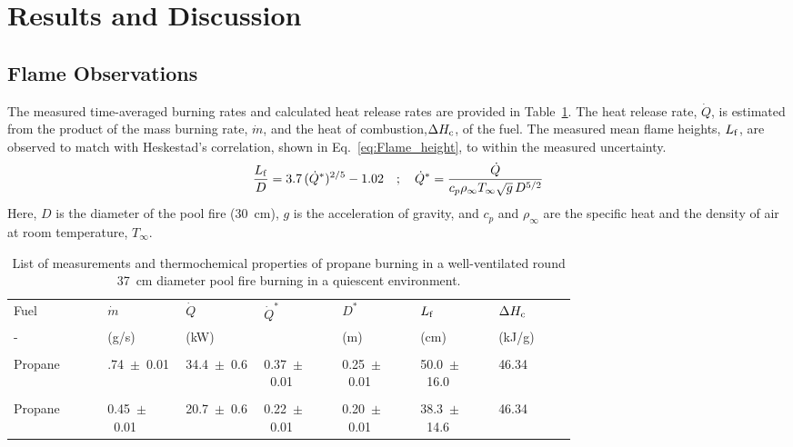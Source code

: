 \documentclass[12pt]{ussci}
\begin{document}
\section{Results and Discussion}
\subsection{Flame Observations}
The measured time-averaged burning rates and calculated heat release rates are provided in Table~\ref{tab:Pool_Fire_Parameters_Table}. The heat release rate, $\dot{Q}$, is estimated from the product of the mass burning rate, $\dot{m}$, and the heat of combustion,$\Delta H_{\rm c}$, of the fuel. The measured mean flame heights, $L_{\rm f}$, are observed to match with Heskestad's correlation, shown in Eq.~\ref{eq:Flame_height}, to within the measured uncertainty.
\begin{equation}\label{eq:Flame_height}
\frac{L_{\rm f}}{D} = 3.7 \, (\dot{Q}^*)^{2/5} - 1.02 \quad ; \quad \dot{Q}^*=\frac{\dot{Q}}{c_{p}\rho_\infty T_\infty \sqrt{g} \, D^{5/2}}
\end{equation}
Here, $D$ is the diameter of the pool fire (30~cm), $g$ is the acceleration of gravity, and $c_p$ and $\rho_\infty$ are the specific heat and the density of air at room temperature, $T_\infty$. 

\begin{table}[!t]
\caption[List of measurements and thermochemical properties of fuels]{List of measurements and thermochemical properties of propane burning in a well-ventilated round 37~cm diameter pool fire burning in a quiescent environment.}
\label{tab:Pool_Fire_Parameters_Table}
\centering
	\footnotesize
	\begin{tabular}{p{0.125\linewidth}p{0.1\linewidth}p{0.1\linewidth}p{0.1\linewidth}p{0.1\linewidth}p{0.1\linewidth}p{0.1\linewidth}}
\hline
{Fuel} &{$\dot{m}$}& { $\dot{Q}$}& {$\dot{Q}^* $}&{$D^*$}&{$L_{\rm f}$}&{$\Delta H_{\rm c}$~\cite{SFPE}}\\
{-} &{(\si{g/{s}})}& {(\si{kW})}& {}&{(\si{m})}&{(\si{cm})}&{(kJ/g)}\\
\hline
\\[0.01cm]
Propane		&	.74~$\pm$~0.01 & 34.4~$\pm$~0.6 & 0.37~$\pm$~0.01 & 0.25~$\pm$~0.01 & 50.0~$\pm$~16.0 & 46.34\\
\\[0.01cm]
Propane		&	0.45~$\pm$~0.01 & 20.7~$\pm$~0.6 &0.22~$\pm$~0.01 & 0.20~$\pm$~0.01 &	38.3~$\pm$~14.6 & 46.34\\
\hline
\end{tabular}
\end{table}
\end{document}
